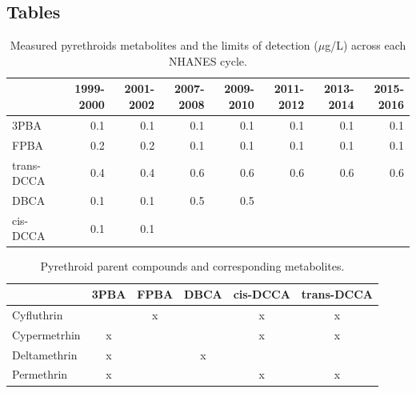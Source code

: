 \documentclass[toxics,article,submit,pdftex,moreauthors]{Definitions/mdpi}
\begin{document}
\subsection{Tables}

\begin{table}[H]
\begin{adjustwidth}{-4cm}{}
  \caption{Measured pyrethroids metabolites and the limits of detection ($\mu$g/L) across each NHANES cycle.}
\label{tab:taba1}
\begin{tabular}{lrrrrrrr}
\toprule
  & 1999-2000 & 2001-2002 & 2007-2008 & 2009-2010 & 2011-2012 & 2013-2014 & 2015-2016\\
\midrule
3PBA & 0.1 & 0.1 & 0.1 & 0.1 & 0.1 & 0.1 & 0.1\\
FPBA & 0.2 & 0.2 & 0.1 & 0.1 & 0.1 & 0.1 & 0.1\\
trans-DCCA & 0.4 & 0.4 & 0.6 & 0.6 & 0.6 & 0.6 & 0.6\\
DBCA & 0.1 & 0.1 & 0.5 & 0.5 &  &  & \\
cis-DCCA & 0.1 & 0.1 &  &  &  &  & \\
\bottomrule
\end{tabular}
\end{adjustwidth}
\end{table}


\begin{table}[H]
\begin{adjustwidth}{-4cm}{}
\caption{\label{tab:taba2}Pyrethroid parent compounds and corresponding metabolites.}
\begin{tabular}[t]{lccccc}
\toprule
  & 3PBA & FPBA & DBCA & cis-DCCA & trans-DCCA\\
\midrule
Cyfluthrin &  & x &  & x & x\\
Cypermetrhin & x &  &  & x & x\\
Deltamethrin & x &  & x &  & \\
Permethrin & x &  &  & x & x\\
\bottomrule
\end{tabular}
\end{adjustwidth}
\end{table}
\end{document}
